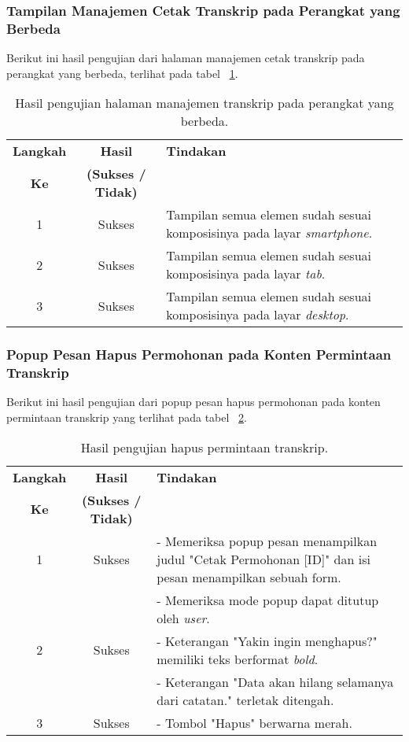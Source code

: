\subsubsection{Tampilan Manajemen Cetak Transkrip pada Perangkat yang Berbeda}
Berikut ini hasil pengujian dari halaman manajemen cetak transkrip pada perangkat yang berbeda, terlihat pada tabel ~\ref{hasil:ManajemenCetakTranskripDevices}.
\begin{table}[H]
	\centering 
	\caption{Hasil pengujian halaman manajemen transkrip pada perangkat yang berbeda.}
	\label{hasil:ManajemenCetakTranskripDevices}
	\begin{tabular}{|c|c|p{}|}
		\toprule
		\textbf{Langkah} & \textbf{Hasil} & \textbf{Tindakan}\\
		\textbf{Ke} & \textbf{(Sukses / Tidak)} & \\		
		\midrule
		1 & Sukses & Tampilan semua elemen sudah sesuai komposisinya pada layar \textit{smartphone}.\\
		\hline
		2 & Sukses & Tampilan semua elemen sudah sesuai komposisinya pada layar \textit{tab}.\\
		\hline
		3 & Sukses & Tampilan semua elemen sudah sesuai komposisinya pada layar \textit{desktop}.\\
		\hline
		\bottomrule		
	\end{tabular} 
\end{table}

\subsubsection{Popup Pesan Hapus Permohonan pada Konten Permintaan Transkrip}
Berikut ini hasil pengujian dari popup pesan hapus permohonan pada konten permintaan transkrip yang terlihat pada tabel ~\ref{hasil:HapusPermintaanTranskrip}.
\begin{table}[H]
	\centering 
	\caption{Hasil pengujian hapus permintaan transkrip.}
	\label{hasil:HapusPermintaanTranskrip}
	\begin{tabular}{|c| c| p{}|}
		\toprule
		\textbf{Langkah} & \textbf{Hasil} & \textbf{Tindakan}\\
		\textbf{Ke} & \textbf{(Sukses / Tidak)} &\\
		\midrule
		1&Sukses& - Memeriksa popup pesan menampilkan judul "Cetak Permohonan [ID]" dan isi pesan menampilkan sebuah form.\\
		&& - Memeriksa mode popup dapat ditutup oleh \textit{user}.\\
		\hline
		2&Sukses& - Keterangan "Yakin ingin menghapus?" memiliki teks berformat \textit{bold}. \\
		&& - Keterangan "Data akan hilang selamanya dari catatan." terletak ditengah.\\
		\hline
		3&Sukses&- Tombol "Hapus" berwarna merah.\\	
		\bottomrule		
	\end{tabular} 
\end{table}

